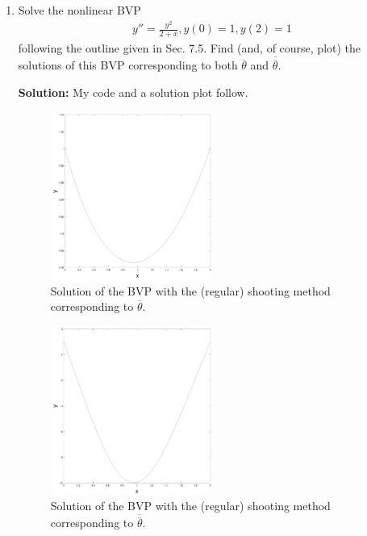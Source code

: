 \documentclass[11pt]{article}
\def\f{\frac }
\begin{document}
\begin{enumerate}
\item Solve the nonlinear BVP
\begin{align*} y'' = \f{y^2}{2+x}, y(0) = 1, y(2) = 1\end{align*}
following the outline given in Sec. 7.5.
Find (and, of course, plot) the solutions of this BVP corresponding to both $\overline{\theta}$ and $\overline{\overline{\theta}}$.

\bigskip
\textbf{Solution:} My code and a solution plot follow.



\begin{figure}[h!]
  \centering
    \includegraphics[width=0.5\textwidth]{andy_hw07_prb05_02.pdf}
  \caption{Solution of the BVP with the (regular) shooting method corresponding to $\overline{\theta}$.}
\end{figure}

\begin{figure}[h!]
  \centering
    \includegraphics[width=0.5\textwidth]{andy_hw07_prb05_01.pdf}
  \caption{Solution of the BVP with the (regular) shooting method corresponding to $\overline{\overline{\theta}}$.}
\end{figure}



\end{enumerate}
\end{document}
